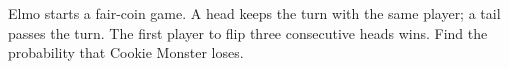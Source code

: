 Elmo starts a fair-coin game. A head keeps the turn with the same player; a tail passes the turn. The first player to flip three consecutive heads wins. Find the probability that Cookie Monster loses.
